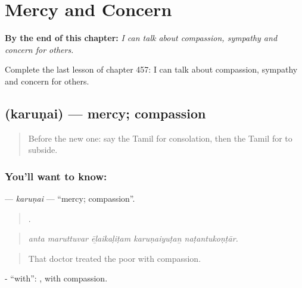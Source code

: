 
\chapter{Mercy and Concern}
\label{ch:ta-mercy-and-concern}

\begin{chapteropening}
\textbf{By the end of this chapter:} \emph{I can talk about compassion, sympathy and concern for others.}

Complete the last lesson of chapter 457: I can talk about compassion, sympathy and concern for others.
\end{chapteropening}

\section[\texorpdfstring{\ta{கருணை} (karuṇai)}{கருணை (karuṇai)}]{ (karuṇai) — mercy; compassion}

\label{lesson:TA-C457-karunai}



\begin{quote}
Before the new one: say the Tamil for consolation, then the Tamil for to subside.
\end{quote}

\subsection*{You'll want to know: }
\textbf{} — \emph{karuṇai} — \textquotedblleft{}mercy; compassion\textquotedblright{}.

\begin{quote}
    .
\end{quote}

\begin{quote}
\emph{anta maruttuvar ēḻaikaḷiṭam karuṇaiyuṭaṉ naṭantukoṇṭār.}
\end{quote}

\begin{quote}
That doctor treated the poor with compassion.
\end{quote}

- \textquotedblleft{}with\textquotedblright{}: , with compassion.

